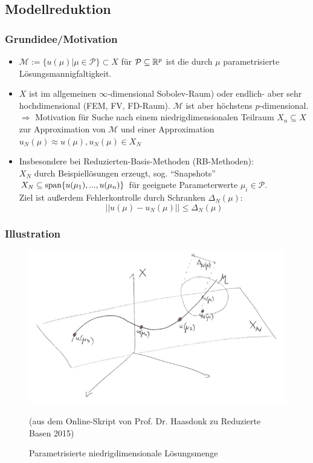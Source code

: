 \subsection{Modellreduktion}
\label{Modellreduktion}

\subsubsection*{Grundidee/Motivation}
\label{Grundidee/Motivation}

\begin{itemize}
	\item $\mathcal{M}:= \{u(\mu) | \mu \in \mathcal{P}\} \subset X$ für $\mathcal{P} \subseteq \mathbb{R}^p$ ist die durch $\mu$ parametrisierte Lösungsmannigfaltigkeit.
	\item $X$ ist im allgemeinen $\infty$-dimensional Sobolev-Raum) oder endlich- aber  sehr hochdimensional (FEM, FV, FD-Raum). $\mathcal{M}$ ist aber höchstens $p$-dimensional. \\
	$\Rightarrow$ Motivation für Suche nach einem niedrigdimensionalen Teilraum $X_n \subseteq X$ zur Approximation von $\mathcal{M}$ und einer Approximation $u_N(\mu) \approx u(\mu), u_N(\mu) \in X_N$
	\item Insbesondere bei Reduzierten-Basis-Methoden (RB-Methoden): \\
	$X_N$ durch Beispiellösungen erzeugt, sog. "`Snapshots"' \\
	$X_N \subseteq \operatorname{span}\{u(\mu_1),...,u(\mu_n)\}$ für geeignete Parameterwerte $\mu_i \in \mathcal{P}$. \\
	Ziel ist außerdem Fehlerkontrolle durch Schranken $\Delta_N(\mu)$: \\
	\[
	||u(\mu) - u_N(\mu)|| \le \Delta_N(\mu)
	\]
\end{itemize}

\subsubsection*{Illustration}

\begin{figure}[H]
  \centering\small
    \includegraphics[width = 0.7 \textwidth]{Bilder/IllustrationM.png}
  \caption{Parametrisierte niedrigdimensionale Lösungsmenge}{(aus dem Online-Skript von Prof. Dr. Haasdonk zu Reduzierte Basen 2015)}
  \label{fig:IllustrationM}
\end{figure}

